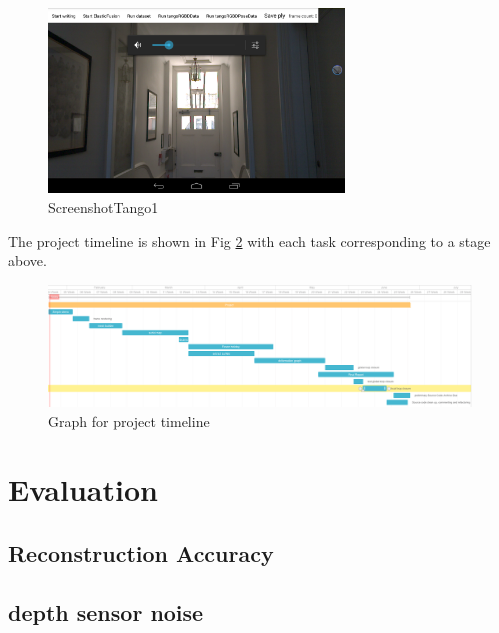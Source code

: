 \documentclass[12pt,twoside]{article}
\begin{document}
\begin{figure}[h]
    \centering
    \includegraphics[width=0.7\textwidth]{figures/ScreenshotTango1}
    \caption{ScreenshotTango1}
    \label{fig:ScreenshotTango1}
\end{figure}




\newpage


The project timeline is shown in Fig \ref{fig:tiemline2} with each task corresponding to a stage above.

\begin{figure}
\centering
    \includegraphics[angle=90,width=\textwidth,height=\textheight,keepaspectratio]{figures/timeline2}
   \caption{Graph for project timeline}
    \label{fig:tiemline2}
\end{figure}

\newpage


\section{Evaluation}


\subsection{Reconstruction Accuracy}








\subsection{depth sensor noise}
\end{document}
